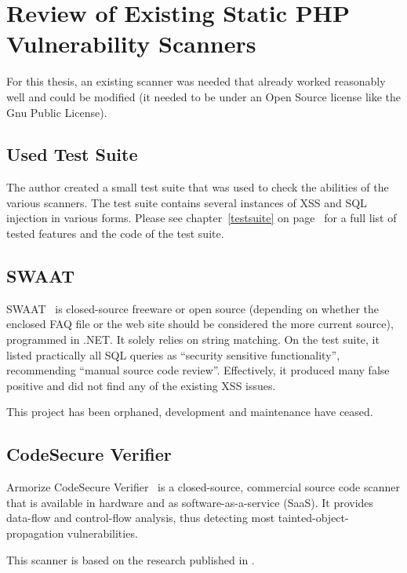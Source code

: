 \chapter{Review of Existing Static PHP Vulnerability Scanners}
\label{scanners}

For this thesis, an existing scanner was needed that already worked reasonably well and could be modified (\ie it needed to be under an Open Source license like the Gnu Public License).

\section{Used Test Suite}
The author created a small test suite that was used to check the abilities of the various scanners. The test suite contains several instances of XSS and SQL injection in various forms. Please see chapter~\ref{testsuite} on page~\pageref{testsuite} for a full list of tested features and the code of the test suite.



\section{SWAAT}
\label{swaat}
SWAAT~\cite{swaat} is closed-source freeware or open source (depending on whether the enclosed FAQ file or the web site should be considered the more current source), programmed in .NET. It solely relies on string matching. On the test suite, it listed practically all SQL queries as ``security sensitive functionality'', recommending ``manual source code review''. Effectively, it produced many false positive and did not find any of the existing XSS issues.

This project has been orphaned, \ie development and maintenance have ceased.

\section{CodeSecure Verifier}
\label{armorize}
Armorize CodeSecure Verifier~\cite{codesecure, verifier} is a closed-source, commercial source code scanner that is available in hardware and as software-as-a-service (SaaS). It provides data-flow and control-flow analysis, thus detecting most tainted-object-propagation vulnerabilities.

This scanner is based on the research published in \cite{huang-securing}.

